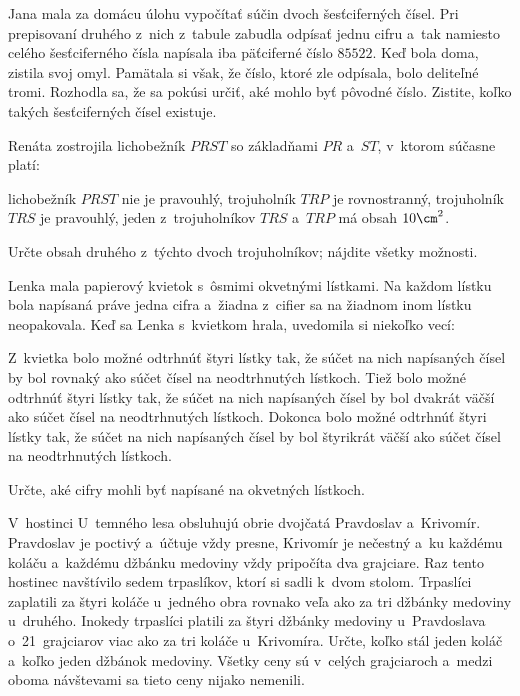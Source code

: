 {%
Jana mala za domácu úlohu vypočítať súčin dvoch šesťciferných čísel. Pri prepisovaní druhého z~nich z~tabule zabudla odpísať jednu cifru a~tak namiesto celého šesťciferného čísla napísala iba päťciferné číslo $85522$. Keď bola doma, zistila svoj omyl. Pamätala si však, že číslo, ktoré zle odpísala, bolo deliteľné tromi. Rozhodla sa, že sa pokúsi určiť, aké mohlo byť pôvodné číslo. Zistite, koľko takých šesťciferných čísel existuje.}

{%
Renáta zostrojila lichobežník $PRST$ so základňami $PR$ a~$ST$, v~ktorom súčasne platí:
\begin{itemize}
\iitem lichobežník $PRST$ nie je pravouhlý,
\iitem trojuholník $TRP$ je rovnostranný,
\iitem trojuholník $TRS$ je pravouhlý,
\iitem jeden z~trojuholníkov $TRS$ a~$TRP$ má obsah $10\cm^2$.
\end{itemize}
Určte obsah druhého z~týchto dvoch trojuholníkov; nájdite všetky možnosti.
}

{%
Lenka mala papierový kvietok s~ôsmimi okvetnými lístkami. Na každom lístku bola napísaná práve jedna cifra a~žiadna z~cifier sa na žiadnom inom lístku neopakovala. Keď sa Lenka s~kvietkom hrala, uvedomila si niekoľko vecí:
\begin{itemize}
\iitem Z~kvietka bolo možné odtrhnúť štyri lístky tak, že súčet na nich napísaných čísel by bol rovnaký ako súčet čísel na neodtrhnutých lístkoch.
\iitem Tiež bolo možné odtrhnúť štyri lístky tak, že súčet na nich napísaných čísel by bol dvakrát väčší ako súčet čísel na neodtrhnutých lístkoch.
\iitem Dokonca bolo možné odtrhnúť štyri lístky tak, že súčet na nich napísaných čísel by bol štyrikrát väčší ako súčet čísel na neodtrhnutých lístkoch.
\end{itemize}
Určte, aké cifry mohli byť napísané na okvetných lístkoch.
}

{%
V~hostinci U~temného lesa obsluhujú obrie dvojčatá Pravdoslav a~Krivomír. Pravdoslav je poctivý a~účtuje vždy presne, Krivomír je nečestný a~ku každému koláču a~každému džbánku medoviny vždy pripočíta dva grajciare. Raz tento hostinec navštívilo sedem trpaslíkov, ktorí si sadli k~dvom stolom. Trpaslíci zaplatili za štyri koláče u~jedného obra rovnako veľa ako za tri džbánky medoviny u~druhého. Inokedy trpaslíci platili za štyri džbánky medoviny u~Pravdoslava o~21~grajciarov viac ako za tri koláče u~Krivomíra. Určte, koľko stál jeden koláč a~koľko jeden džbánok medoviny. Všetky ceny sú v~celých grajciaroch a~medzi oboma návštevami sa tieto ceny nijako nemenili.}

